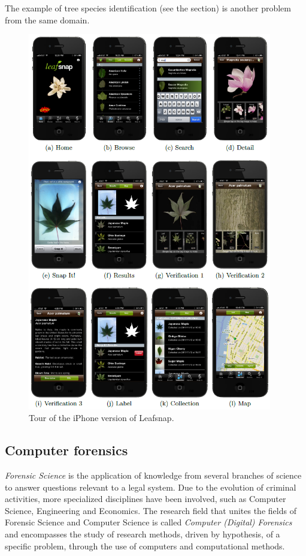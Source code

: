 The example of tree species identification (see the \underline{} section) is another problem from the same domain.
\begin{figure}[H]
\begin{center}
\includegraphics[width=0.95\textwidth]{fig/LeafSnap}
\end{center}
\caption{Tour of the iPhone version of Leafsnap.}
\label{fig:Leafsnap}
\end{figure}



\subsection{Computer forensics}
{\em  Forensic Science} is the application of knowledge from several branches of science to answer questions relevant to a legal system. Due to the evolution of criminal activities, more
specialized disciplines have been involved, such as Computer Science, Engineering and Economics.
The research field that unites the fields of Forensic Science and Computer Science is called {\em Computer (Digital) Forensics} and encompasses the study of research methods, driven by
hypothesis, of a specific problem, through the use of computers and computational methods.

